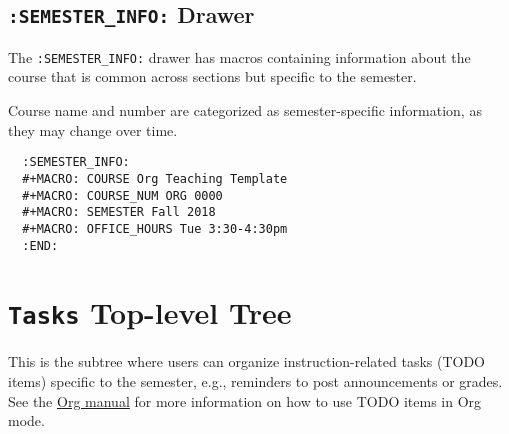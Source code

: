\documentclass[10pt,article]{article}
\begin{document}
\subsection{\texttt{:SEMESTER\_INFO:} Drawer}
\label{sec:org24625fb}
The \texttt{:SEMESTER\_INFO:} drawer has macros containing information about
the course that is common across sections but specific to the semester.

\begin{mdframed}
Course name and number are categorized as semester-specific information, as they may change over time.
\end{mdframed}

\begin{verbatim}
  :SEMESTER_INFO:
  #+MACRO: COURSE Org Teaching Template
  #+MACRO: COURSE_NUM ORG 0000
  #+MACRO: SEMESTER Fall 2018
  #+MACRO: OFFICE_HOURS Tue 3:30-4:30pm
  :END:
\end{verbatim}
\section{\texttt{Tasks} Top-level Tree}
\label{sec:org1728274}
This is the subtree where users can organize instruction-related tasks
(TODO items) specific to the semester, e.g., reminders to post
announcements or grades. See the \href{https://orgmode.org/manual/TODO-items.html}{Org manual} for more information on
how to use TODO items in Org mode.
\end{document}
